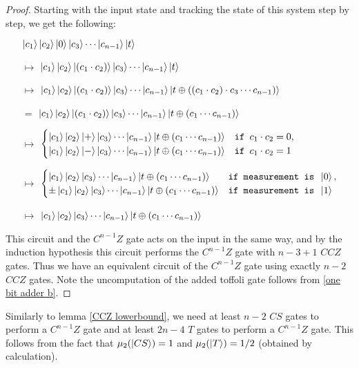 \documentclass[12pt]{dalthesis}
\begin{document}
\begin{proof}
Starting with the input state and tracking the state of this system step by step, we get the following: 
\begin{itemize}
\item[] $\ket{c_1}\ket{c_2}\ket{0}\ket{c_3} \cdots \ket{c_{n-1}}\ket{t}$
\item[$\mapsto$] $\ket{c_1}\ket{c_2}\ket{(c_1 \cdot c_2)}\ket{c_3} \cdots \ket{c_{n-1}}\ket{t}$
\item[$\mapsto$] $\ket{c_1}\ket{c_2}\ket{(c_1 \cdot c_2)}\ket{c_3} \cdots \ket{c_{n-1}} \ket{t \oplus ((c_1 \cdot c_2) \cdot c_3 \cdots c_{n-1})}$
\item[$=$] $\ket{c_1}\ket{c_2}\ket{(c_1 \cdot c_2)}\ket{c_3} \cdots \ket{c_{n-1}} \ket{t \oplus (c_1 \cdots c_{n-1})}$
\item[$\mapsto$] $\begin{cases} \ket{c_1}\ket{c_2}\ket{+}\ket{c_3} \cdots \ket{c_{n-1}} \ket{t \oplus (c_1 \cdots c_{n-1})} & \texttt{if } c_1 \cdot c_2 = 0, \\
\ket{c_1}\ket{c_2}\ket{-}\ket{c_3} \cdots \ket{c_{n-1}} \ket{t \oplus (c_1 \cdots c_{n-1})} & \texttt{if } c_1 \cdot c_2 = 1 \end{cases}$
\item[$\mapsto$] $\begin{cases} \ket{c_1}\ket{c_2}\ket{c_3} \cdots \ket{c_{n-1}} \ket{t \oplus (c_1 \cdots c_{n-1})} & \texttt{if measurement is } \ket{0} , \\
\pm \ket{c_1}\ket{c_2}\ket{c_3} \cdots \ket{c_{n-1}} \ket{t \oplus (c_1 \cdots c_{n-1})} & \texttt{if measurement is } \ket{1} \end{cases}$
\item[$\mapsto$] $\ket{c_1}\ket{c_2}\ket{c_3} \cdots \ket{c_{n-1}}\ket{t \oplus (c_1 \cdots c_{n-1})}$
\end{itemize}
This circuit and the $C^{n-1}Z$ gate acts on the input in the same way, and by the induction hypothesis this circuit performs the $C^{n-1}Z$ gate with $n-3 +1$ $CCZ$ gates. Thus we have an equivalent circuit of the $C^{n-1}Z$ gate using exactly $n-2$ $CCZ$ gates. Note the uncomputation of the added toffoli gate follows from \ref{one bit adder b}.
\end{proof}

Similarly to lemma \ref{CCZ lowerbound}, we need at least $n-2$ $CS$ gates to perform a $C^{n-1}Z$ gate and at least $2n-4$ $T$ gates to perform a $C^{n-1}Z$ gate. This follows from the fact that $\mu_2 (\ket{CS}) = 1$ and $\mu_2 (\ket{T}) = 1/2$ (obtained by calculation).
\end{document}
